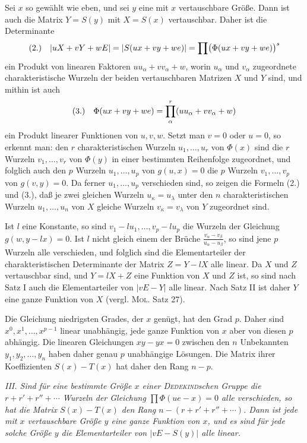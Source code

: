 \documentclass[11pt]{article}
\newcommand{\fnum}[1]{\textup{(\ensuremath{#1}.)}\quad}
\begin{document}
Sei $x$ so gewählt wie eben, und sei $y$ eine mit $x$ vertauschbare Größe. Dann ist auch die Matrix $Y=S(y)$ mit $X=S(x)$ vertauschbar. Daher ist die Determinante
\[
\fnum{2} |uX+vY+wE|=|S(ux+vy+we)|=\prod\bigl(\Phi(ux+vy+we)\bigr)^s
\]
ein Produkt von linearen Faktoren $uu_\alpha+vv_\alpha+w$, worin $u_\alpha$ und $v_\alpha$ zugeordnete charakteristische Wurzeln der beiden vertauschbaren Matrizen $X$ und $Y$ sind, und mithin ist auch
\[
\fnum{3} \Phi(ux+vy+we)=\prod_\alpha^{r}(uu_\alpha+vv_\alpha+w)
\]
ein Produkt linearer Funktionen von $u,v,w$. Setzt man $v=0$ oder $u=0$, so erkennt man: den $r$ charakteristischen Wurzeln $u_1,\ldots,u_r$ von $\Phi(x)$ sind die $r$ Wurzeln $v_1,\ldots,v_r$ von $\Phi(y)$ in einer bestimmten Reihenfolge zugeordnet, und folglich auch den $p$ Wurzeln $u_1,\ldots,u_p$ von $g(u,x)=0$ die $p$ Wurzeln $v_1,\ldots,v_p$ von $g(v,y)=0$. Da ferner $u_1,\ldots,u_p$ verschieden sind, so zeigen die Formeln (2.) und (3.), daß je zwei gleichen Wurzeln $u_\kappa=u_\lambda$ unter den $n$ charakteristischen Wurzeln $u_1,\ldots,u_n$ von $X$ gleiche Wurzeln $v_\kappa=v_\lambda$ von $Y$ zugeordnet sind.

Ist $l$ eine Konstante, so sind $v_1-lu_1,\ldots,v_p-lu_p$ die Wurzeln der Gleichung $g(w,y-lx)=0$. Ist $l$ nicht gleich einem der Brüche $\frac{v_\alpha-v_\beta}{u_\alpha-u_\beta}$, so sind jene $p$ Wurzeln alle verschieden, und folglich sind die Elementarteiler der charakteristischen Determinante der Matrix $Z=Y-lX$ alle linear. Da $X$ und $Z$ vertauschbar sind, und $Y=lX+Z$ eine Funktion von $X$ und $Z$ ist, so sind nach Satz I auch die Elementarteiler von $|vE-Y|$ alle linear. Nach Satz II ist daher $Y$ eine ganze Funktion von $X$ (vergl. \textsc{Mol}. Satz 27).

Die Gleichung niedrigsten Grades, der $x$ genügt, hat den Grad $p$. Daher sind $x^0,x^1,\ldots,x^{p-1}$ linear unabhängig, jede ganze Funktion von $x$ aber von diesen $p$ abhängig. Die linearen Gleichungen $xy-yx=0$ zwischen den $n$ Unbekannten $y_1,y_2,\ldots,y_n$ haben daher genau $p$ unabhängige Lösungen. Die Matrix ihrer Koeffizienten $S(x)-T(x)$ hat daher den Rang $n-p$.

\emph{III. Sind für eine bestimmte Größe $x$ einer \textsc{Dedekind}schen Gruppe die $r+r'+r''+\cdots$ Wurzeln der Gleichung $\prod\Phi(ue-x)=0$ alle verschieden, so hat die Matrix $S(x)-T(x)$ den Rang $n-(r+r'+r''+\cdots)$. Dann ist jede mit $x$ vertauschbare Größe $y$ eine ganze Funktion von $x$, und es sind für jede solche Größe $y$ die Elementarteiler von $|vE-S(y)|$ alle linear.}
\end{document}
